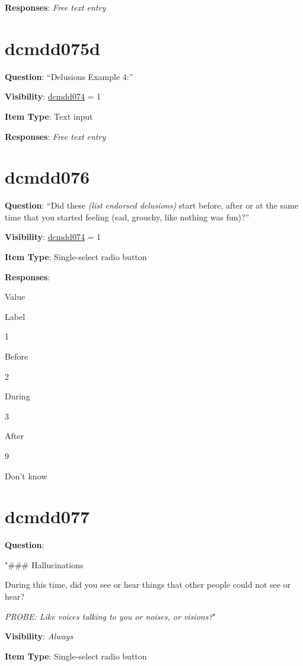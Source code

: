 \documentclass[
]{book}
\begin{document}
\textbf{Responses}: \emph{Free text entry}

\hypertarget{dcmdd075d}{%
\section{dcmdd075d}\label{dcmdd075d}}

\textbf{Question}: ``Delusions Example 4:''

\textbf{Visibility}: \protect\hyperlink{dcmdd074}{dcmdd074} = 1

\textbf{Item Type}: Text input

\textbf{Responses}: \emph{Free text entry}

\hypertarget{dcmdd076}{%
\section{dcmdd076}\label{dcmdd076}}

\textbf{Question}: ``Did these \emph{(list endorsed delusions)} start before, after or at the same time that you started feeling (sad, grouchy, like nothing was fun)?''

\textbf{Visibility}: \protect\hyperlink{dcmdd074}{dcmdd074} = 1

\textbf{Item Type}: Single-select radio button

\textbf{Responses}:

Value

Label

1

Before

2

During

3

After

9

Don't know

\hypertarget{dcmdd077}{%
\section{dcmdd077}\label{dcmdd077}}

\textbf{Question}:

"\#\#\# Hallucinations

During this time, did you see or hear things that other people could not see or hear?

\emph{PROBE: Like voices talking to you or noises, or visions?}"

\textbf{Visibility}: \emph{Always}

\textbf{Item Type}: Single-select radio button
\end{document}
